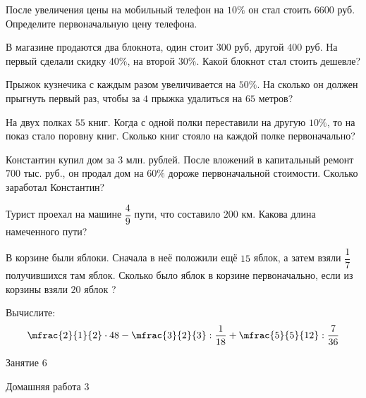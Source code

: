 \begin{class}[number=5]
	\begin{listofex}
		\item После увеличения цены на мобильный телефон на \( 10\% \) он стал стоить \( 6600 \) руб. Определите первоначальную цену телефона.
		\item  В магазине продаются два блокнота, один стоит \( 300 \) руб, другой \( 400 \) руб. На первый сделали скидку \( 40\% \), на второй \( 30\% \). Какой блокнот стал стоить дешевле?
		\item Прыжок кузнечика с каждым разом увеличивается на \( 50\% \). На сколько он должен прыгнуть первый раз, чтобы за \( 4 \) прыжка удалиться на \( 65 \) метров?
		\item На двух полках \( 55 \) книг. Когда с одной полки переставили на другую \( 10\% \), то на показ стало поровну книг. Сколько книг стояло на каждой полке первоначально?
		\item Константин купил дом за \( 3 \) млн. рублей. После вложений в капитальный ремонт \( 700 \) тыс. руб., он продал дом на \( 60\% \) дороже первоначальной стоимости. Сколько заработал Константин?
		\item Турист проехал на машине \( \dfrac{4}{9} \) пути, что составило \( 200 \) км. Какова длина намеченного пути?
		\item В корзине были яблоки. Сначала в неё положили ещё \( 15 \) яблок, а затем взяли \( \dfrac{1}{7} \) получившихся там яблок. Сколько было яблок в корзине первоначально, если из корзины взяли \( 20 \) яблок ?
		\item Вычислите:
		\[\mfrac{2}{1}{2}\cdot48-\mfrac{3}{2}{3}:\dfrac{1}{18}+\mfrac{5}{5}{12}:\dfrac{7}{36}\]
	\end{listofex}
\end{class}

\begin{class}[number=6]
	\begin{listofex}
		\item Занятие 6
	\end{listofex}
\end{class}

\begin{homework}[number=3]
	\begin{listofex}
		\item Домашняя работа 3
	\end{listofex}
\end{homework}

